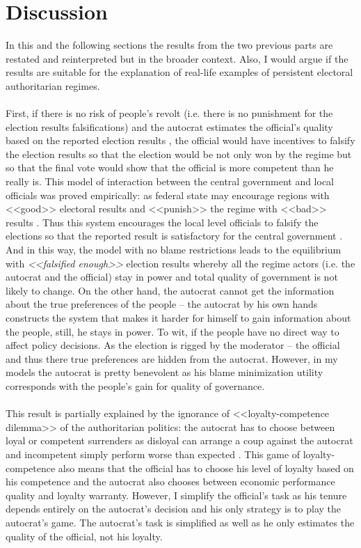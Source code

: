 \documentclass[a4paper, 12pt]{article}
\begin{document}
	\section{Discussion}
	In this and the following sections the results from the two previous parts are restated and reinterpreted but in the broader context. Also, I would argue if the results are suitable for the explanation of real-life examples of persistent electoral authoritarian regimes.
    \\\\
	\noindent First, if there is no risk of people's revolt (i.e. there is no punishment for the election results falsifications) and the autocrat estimates the official's quality based on the reported election results \parencite{parties_elections}, the official would have incentives to falsify the election results so that the election would be not only won by the regime but so that the final vote would show that the official is more competent than he really is. This model of interaction between the central government and local officials was proved empirically: as federal state may encourage regions with <<good>> electoral results and <<punish>> the regime with <<bad>> results \parencite{russianregons}. Thus this system encourages the local level officials to falsify the elections so that the reported result is satisfactory for the central government \parencite{golosov}. And in this way, the model with no blame restrictions leads to the equilibrium with \textit{<<falsified enough>>} election results whereby all the regime actors (i.e. the autocrat and the official) stay in power and total quality of government is not likely to change. On the other hand, the autocrat cannot get the information about the true preferences of the people -- the autocrat by his own hands constructs the system that makes it harder for himself to gain information about the people, still, he stays in power. To wit, if the people have no direct way to affect policy decisions. As the election is rigged by the moderator -- the official and thus there true preferences are hidden from the autocrat. However, in my models the autocrat is pretty benevolent as his blame minimization utility corresponds with the people's gain for quality of governance.\\\\
	This result is partially explained by the ignorance of <<loyalty-competence dilemma>> of the authoritarian politics: the autocrat has to choose between loyal or competent surrenders as disloyal can arrange a coup against the autocrat and incompetent simply perform worse than expected \parencite{loyal_competent_2}. This game of loyalty-competence also means that the official has to choose his level of loyalty based on his competence \parencite{loyal_competent_1} and the autocrat also chooses between economic performance quality and loyalty warranty. However, I simplify the official's task as his tenure depends entirely on the autocrat's decision and his only strategy is to play the autocrat's game. The autocrat's task is simplified as well as he only estimates the quality of the official, not his loyalty.\\\\
\end{document}
